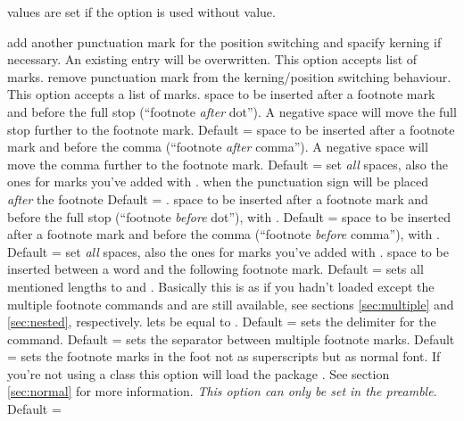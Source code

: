 \documentclass[toc=index,toc=bib]{cnpkgdoc}
\begin{document}
 values are set if the option is used without value.
\begin{beschreibung}
  add another punctuation
 mark for the position switching and spacify kerning if necessary. An existing entry
 will be overwritten. This option accepts list of marks.
  remove punctuation mark from the kerning/position
 switching behaviour. This option accepts a list of marks.
  space to be inserted after a footnote mark and
 before the full stop (``footnote \emph{after} dot''). A negative space
 will move the full stop further to the footnote mark. Default = \code{-.06em}
  space to be inserted after a footnote mark and
 before the comma (``footnote \emph{after} comma''). A negative space
 will move the comma further to the footnote mark.  Default = \code{-.06em}
  set \emph{all} spaces, \ie also the ones for
 marks you've added with .
  when  the punctuation sign
 will be placed \emph{after} the footnote Default = .
  space to be inserted after a footnote mark and
 before the full stop (``footnote \emph{before} dot''), \ie with
 . Default = \code{-.15em}
  space to be inserted after a footnote mark and
 before the comma (``footnote \emph{before} comma''), \ie with
 . Default = \code{-.15em}
  set \emph{all} spaces, \ie also the ones for
 marks you've added with .
  space to be inserted between a word and
 the following footnote mark. Default = \code{.06em}
  sets all mentioned lengths to \code{0pt} and
 . Basically this is as if you hadn't loaded \fnpct except
 the multiple footnote commands and  are still available, see
 sections \ref{sec:multiple} and \ref{sec:nested}, respectively.
  lets  be equal to
 . Default = 
  sets the delimiter for the 
 command. Default = \code{;}
  sets the separator between multiple footnote
 marks. Default = \code{,}
  sets the footnote marks in the foot
 not as superscripts but as normal font. If you're not using a 
 class this option will load the package . See section \ref{sec:normal}
 for more information. \emph{This option can only be set in the preamble}. Default
 = 
\end{beschreibung}
\end{document}
